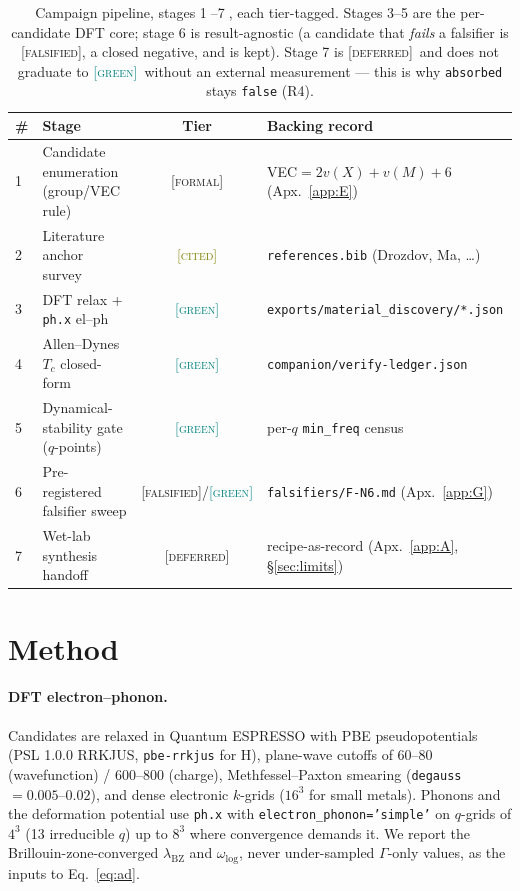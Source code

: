 \documentclass[11pt,a4paper]{article}
\newcommand{\tierBlue}{\textcolor{blue!60!black}{[\textsc{formal}]}}
\newcommand{\tierGreen}{\textcolor{teal}{[\textsc{green}]}}
\newcommand{\tierYellow}{\textcolor{olive}{[\textsc{cited}]}}
\newcommand{\tierOrange}{\textcolor{orange!85!black}{[\textsc{deferred}]}}
\newcommand{\tierRed}{\textcolor{red!75!black}{[\textsc{falsified}]}}
\begin{document}
\medskip
\begin{table}[h]
\centering
\small
\begin{tabular}{@{}>{\centering\arraybackslash}m{0.4cm} >{\raggedright\arraybackslash}m{4.2cm} c >{\raggedright\arraybackslash}m{6cm}@{}}
\toprule
\textbf{\#} & \textbf{Stage} & \textbf{Tier} & \textbf{Backing record} \\
\midrule
\textcircled{\scriptsize 1} & Candidate enumeration (group/VEC rule) & \tierBlue   & VEC$=2v(X)+v(M)+6$ (Apx.~\ref{app:E}) \\
\textcircled{\scriptsize 2} & Literature anchor survey              & \tierYellow & \texttt{references.bib} (Drozdov, Ma, \dots) \\
\textcircled{\scriptsize 3} & DFT relax + \texttt{ph.x} el--ph       & \tierGreen  & \texttt{exports/material\_discovery/*.json} \\
\textcircled{\scriptsize 4} & Allen--Dynes $T_c$ closed-form         & \tierGreen  & \texttt{companion/verify-ledger.json} \\
\textcircled{\scriptsize 5} & Dynamical-stability gate ($q$-points)  & \tierGreen  & per-$q$ \texttt{min\_freq} census \\
\textcircled{\scriptsize 6} & Pre-registered falsifier sweep         & \tierRed/\tierGreen & \texttt{falsifiers/F-N6.md} (Apx.~\ref{app:G}) \\
\textcircled{\scriptsize 7} & Wet-lab synthesis handoff              & \tierOrange & recipe-as-record (Apx.~\ref{app:A}, \S \ref{sec:limits}) \\
\bottomrule
\end{tabular}
\caption{Campaign pipeline, stages \textcircled{\scriptsize 1}--\textcircled{\scriptsize 7},
each tier-tagged. Stages 3--5 are the per-candidate DFT core; stage 6 is
result-agnostic (a candidate that \emph{fails} a falsifier is \tierRed, a
closed negative, and is kept). Stage 7 is \tierOrange\ and does not graduate
to \tierGreen\ without an external measurement --- this is why
\texttt{absorbed} stays \texttt{false} (R4).}
\label{tab:pipeline}
\end{table}

\section{Method}
\label{sec:method}

\paragraph{DFT electron--phonon.}
Candidates are relaxed in Quantum ESPRESSO with PBE pseudopotentials (PSL
1.0.0 RRKJUS, \texttt{pbe-rrkjus} for H), plane-wave cutoffs of
\SIrange{60}{80}{\rydberg} (wavefunction) / \SIrange{600}{800}{\rydberg}
(charge), Methfessel--Paxton smearing
(\texttt{degauss}\,$=\numrange{0.005}{0.02}$), and dense electronic
$k$-grids ($16^3$ for small metals). Phonons and the deformation potential
use \texttt{ph.x} with \texttt{electron\_phonon='simple'} on $q$-grids of
$4^3$ (13 irreducible $q$) up to $8^3$ where convergence demands it. We
report the Brillouin-zone-converged $\lambda_{\mathrm{BZ}}$ and
$\omega_{\log}$, never under-sampled $\Gamma$-only values, as the inputs to
Eq.~\eqref{eq:ad}.
\end{document}
